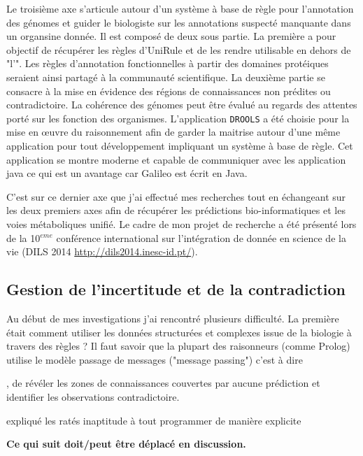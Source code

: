 \begin{refsegment}
Le troisième axe s'articule autour d'un système à base de règle pour l'annotation des génomes et guider le biologiste sur les annotations suspecté manquante dans un organsine donnée. Il est composé de deux sous partie. La première a pour objectif de récupérer les règles d'UniRule et de les rendre utilisable en dehors de "l'". Les règles d'annotation fonctionnelles à partir des domaines protéiques seraient ainsi partagé à la communauté scientifique. La deuxième partie se consacre à la mise en évidence des régions de connaissances non prédites ou contradictoire. La cohérence des génomes peut être évalué au regards des attentes porté sur les fonction des organismes. L'application \texttt{DROOLS} a été choisie pour la mise en œuvre du raisonnement afin de garder la maitrise autour d'une même application pour tout développement impliquant un système à base de règle. Cet application se montre moderne et capable de communiquer avec les application java ce  qui est un avantage car Galileo est écrit en Java.

C'est sur ce dernier axe que j'ai effectué mes recherches tout en échangeant sur les deux premiers axes afin de récupérer les prédictions bio-informatiques et les voies métaboliques unifié. Le cadre de mon projet de recherche a été présenté lors de la 10$^{eme}$ conférence international sur l'intégration de donnée en science de la vie (DILS 2014 \url{http://dils2014.inesc-id.pt/}).



\subsection{Gestion de l'incertitude et de la contradiction}

Au début de mes investigations j'ai rencontré plusieurs difficulté. La première était comment utiliser les données structurées et complexes issue de la biologie à travers des règles ? Il faut savoir que la plupart des raisonneurs (comme Prolog) utilise le modèle passage de messages ("message passing") c'est à dire

, de révéler les zones de connaissances couvertes par aucune prédiction et identifier les observations contradictoire.

expliqué les ratés
inaptitude à tout programmer de manière explicite

\textbf{Ce qui suit doit/peut être déplacé en discussion.}


\end{refsegment}

